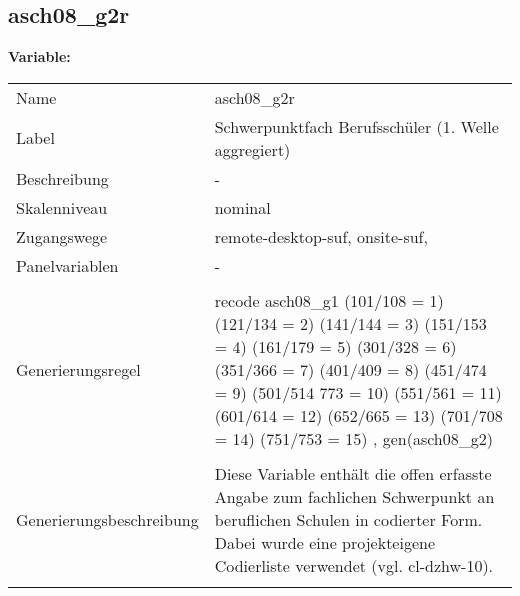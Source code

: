 	
	
	\subsection{asch08\_g2r}
	\label{subSection:asch08_g2r}

	\noindent\textbf{Variable:}\\
		\begin{tabular}{lL{11.3cm}}
			\label{tableVariable:asch08_g2r}
			Name & asch08\_g2r \\
			Label & Schwerpunktfach Berufsschüler (1. Welle aggregiert) \\
			Beschreibung & - \\
			Skalenniveau & nominal \\
			Zugangswege &
				remote-desktop-suf,
				onsite-suf,
 \\
			Panelvariablen & -
			 \\
			 \\
					Generierungsregel & recode asch08\_g1 (101/108 = 1) (121/134 = 2) (141/144 = 3) 
(151/153 = 4) (161/179 = 5) (301/328 = 6) (351/366 = 7) 
(401/409 = 8) (451/474 = 9) (501/514 773 = 10) (551/561 = 11) 
(601/614 = 12) (652/665 = 13) (701/708 = 14) (751/753 = 15)
, gen(asch08\_g2) \\
				 \\
					Generierungsbeschreibung & Diese Variable enthält die offen erfasste Angabe zum fachlichen Schwerpunkt an beruflichen Schulen in codierter Form. Dabei wurde eine projekteigene Codierliste verwendet (vgl. cl-dzhw-10).
				 \\	
			 \\
		\end{tabular}






